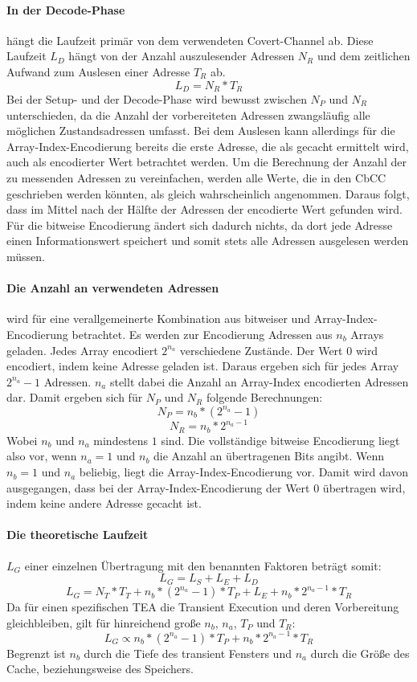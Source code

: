 \paragraph{In der Decode-Phase}
hängt die Laufzeit primär von dem verwendeten
Covert-Channel ab. Diese Laufzeit $L_D$ hängt von der Anzahl
auszulesender Adressen $N_R$ und dem zeitlichen Aufwand zum
Auslesen einer Adresse $T_R$ ab.
\[L_D=N_R*T_R\]
Bei der Setup- und der Decode-Phase wird bewusst zwischen $N_P$ und
$N_R$ unterschieden, da die Anzahl der vorbereiteten Adressen
zwangsläufig alle möglichen Zustandsadressen umfasst. Bei dem
Auslesen kann allerdings für die Array-Index-Encodierung bereits
die erste Adresse, die als gecacht ermittelt
wird, auch als encodierter Wert betrachtet werden.
Um die Berechnung der Anzahl der zu messenden Adressen zu
vereinfachen, werden alle Werte, die in den \ac{CbCC} geschrieben
werden könnten, als gleich wahrscheinlich angenommen.
Daraus folgt, dass im Mittel nach der Hälfte der Adressen
der encodierte Wert gefunden wird.
Für die bitweise Encodierung ändert sich dadurch nichts, da dort
jede Adresse einen Informationswert speichert und somit stets alle
Adressen ausgelesen werden müssen.

\paragraph{Die Anzahl an verwendeten Adressen}
wird für eine verallgemeinerte Kombination aus bitweiser und
Array-Index-Encodierung betrachtet.
Es werden zur Encodierung Ad\-ressen aus $n_b$ Arrays geladen.
Jedes Array encodiert $2^{n_a}$ verschiedene Zustände. Der Wert
$0$ wird encodiert, indem keine Adresse geladen ist. Daraus
ergeben sich für jedes Array $2^{n_a}-1$ Adressen. $n_a$ stellt
dabei die Anzahl an Array-Index encodierten Adressen dar.
Damit ergeben sich für $N_P$ und $N_R$ folgende Berechnungen:
\[N_P=n_b*(2^{n_a}-1)\]
\[N_R=n_b*2^{n_a-1}\]
Wobei $n_b$ und $n_a$ mindestens $1$ sind. Die vollständige
bitweise Encodierung liegt also vor, wenn $n_a=1$ und $n_b$
die Anzahl an übertragenen Bits angibt. Wenn $n_b=1$ und
$n_a$ beliebig, liegt die Array-Index-Encodierung vor.
Damit wird davon ausgegangen, dass bei der
Array-Index-Encodierung der Wert 0 übertragen wird, indem
keine andere Adresse gecacht ist.

\paragraph{Die theoretische Laufzeit}
$L_G$ einer einzelnen Übertragung mit den benannten Faktoren
beträgt somit:
\[L_G=L_S+L_E+L_D\]
\[L_G=N_T*T_T+n_b*(2^{n_a}-1)*T_P+L_E+n_b*2^{n_a-1}*T_R\]
Da für einen spezifischen \ac{TEA} die Transient Execution
und deren Vorbereitung gleichbleiben, gilt für
hinreichend große $n_b$, $n_a$, $T_P$ und $T_R$:
\[L_G\propto n_b*(2^{n_a}-1)*T_P+n_b*2^{n_a-1}*T_R\]
Begrenzt ist $n_b$ durch die Tiefe des transient Fensters und
$n_a$ durch die Größe des Cache, beziehungsweise des Speichers.

